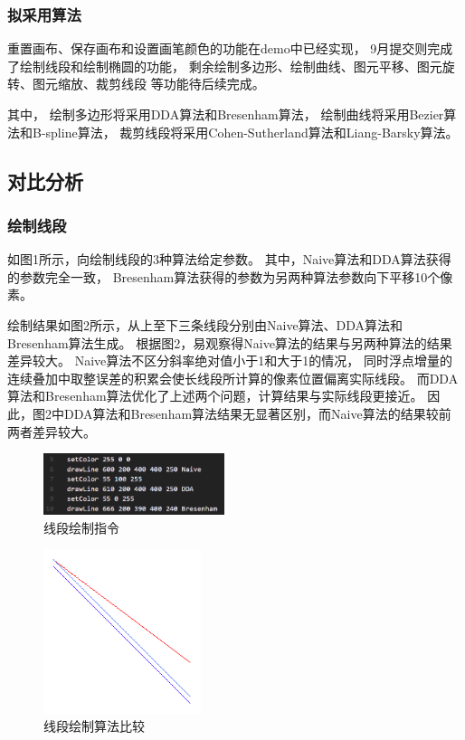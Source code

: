 \documentclass[a4paper,UTF8]{article}
\theoremstyle{definition}
\begin{document}
\subsubsection{拟采用算法}
重置画布、保存画布和设置画笔颜色的功能在demo中已经实现，
9月提交则完成了绘制线段和绘制椭圆的功能，
剩余绘制多边形、绘制曲线、图元平移、图元旋转、图元缩放、裁剪线段
等功能待后续完成。

其中，
绘制多边形将采用DDA算法和Bresenham算法，
绘制曲线将采用Bezier算法和B-spline算法，
裁剪线段将采用Cohen-Sutherland算法和Liang-Barsky算法。


        
\subsection{对比分析}

\subsubsection{绘制线段}
如图1所示，向绘制线段的3种算法给定参数。
其中，Naive算法和DDA算法获得的参数完全一致，
Bresenham算法获得的参数为另两种算法参数向下平移10个像素。

绘制结果如图2所示，从上至下三条线段分别由Naive算法、DDA算法和Bresenham算法生成。
根据图2，易观察得Naive算法的结果与另两种算法的结果差异较大。
Naive算法不区分斜率绝对值小于1和大于1的情况，
同时浮点增量的连续叠加中取整误差的积累会使长线段所计算的像素位置偏离实际线段\cite{ref1}。
而DDA算法和Bresenham算法优化了上述两个问题，计算结果与实际线段更接近。
因此，图2中DDA算法和Bresenham算法结果无显著区别，而Naive算法的结果较前两者差异较大。

\begin{figure}[H]
    \centering
    \includegraphics[width=5.3cm,height=1.8cm]{1.png}
    \caption{线段绘制指令}
\end{figure}

\begin{figure}[H]
    \centering
    \includegraphics[width=4.6cm,height=4.8cm]{2.png}
    \caption{线段绘制算法比较}
\end{figure}
\end{document}
